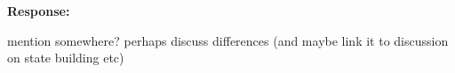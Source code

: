 \documentclass[12pt, a4paper, notitlepage]{article}
\begin{document}
\noindent\textbf{Response:} {}

mention somewhere? perhaps discuss differences (and maybe link it to discussion on state building etc)

%
%
%
%
%
%
\end{document}
